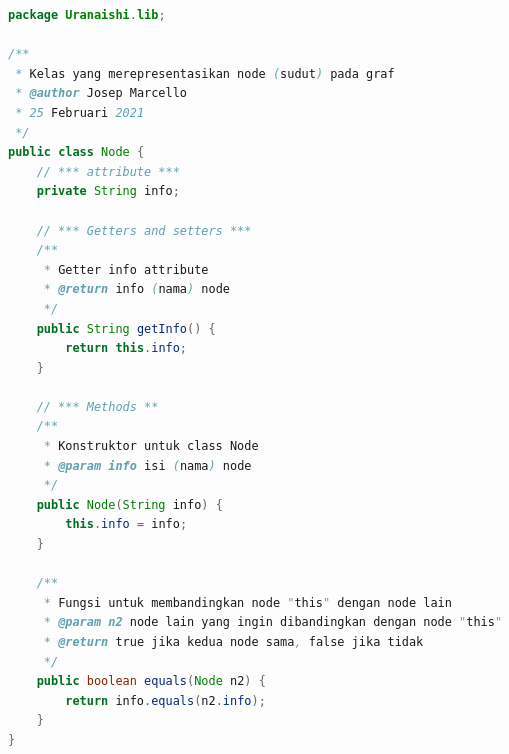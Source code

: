 \documentclass{article}
\begin{document}
\begin{lstlisting}[caption = lib/Node.java, language = java]
package Uranaishi.lib;

/**
 * Kelas yang merepresentasikan node (sudut) pada graf
 * @author Josep Marcello
 * 25 Februari 2021
 */
public class Node {
    // *** attribute ***
    private String info;

    // *** Getters and setters ***
    /**
     * Getter info attribute
     * @return info (nama) node
     */
    public String getInfo() {
        return this.info;
    }

    // *** Methods **
    /**
     * Konstruktor untuk class Node
     * @param info isi (nama) node
     */
    public Node(String info) {
        this.info = info;
    }

    /**
     * Fungsi untuk membandingkan node "this" dengan node lain
     * @param n2 node lain yang ingin dibandingkan dengan node "this"
     * @return true jika kedua node sama, false jika tidak
     */
    public boolean equals(Node n2) {
        return info.equals(n2.info);
    }
}
\end{lstlisting}
\end{document}
